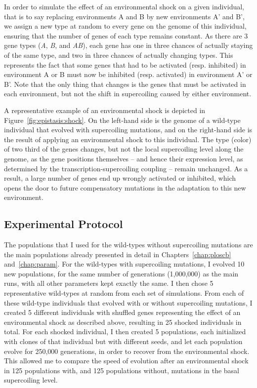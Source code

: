 In order to simulate the effect of an environmental shock on a given individual, that is to say replacing environments A and B by new environments A' and B', we assign a new type at random to every gene on the genome of this individual, ensuring that the number of genes of each type remains constant.
As there are 3 gene types (\emph{A}, \emph{B}, and \emph{AB}), each gene has one in three chances of actually staying of the same type, and two in three chances of actually changing types.
This represents the fact that some genes that had to be activated (resp. inhibited) in environment A or B must now be inhibited (resp. activated) in environment A' or B'.
Note that the only thing that changes is the genes that must be activated in each environment, but not the shift in supercoiling caused by either environment.

A representative example of an environmental shock is depicted in Figure~\ref{fig:epistasis:shock}.
On the left-hand side is the genome of a wild-type individual that evolved with supercoiling mutations, and on the right-hand side is the result of applying an environmental shock to this individual.
The type (color) of two third of the genes changes, but not the local supercoiling level along the genome, as the gene positions themselves -- and hence their expression level, as determined by the transcription-supercoiling coupling -- remain unchanged.
As a result, a large number of genes end up wrongly activated or inhibited, which opens the door to future compensatory mutations in the adaptation to this new environment.

\subsection{Experimental Protocol}

The populations that I used for the wild-types without supercoiling mutations are the main populations already presented in detail in Chapters~\ref{chap:ploscb} and~\ref{chap:param}.
For the wild-types with supercoiling mutations, I evolved 10 new populations, for the same number of generations (1,000,000) as the main runs, with all other parameters kept exactly the same.
I then chose 5 representative wild-types at random from each set of simulations.
From each of these wild-type individuals that evolved with or without supercoiling mutations, I created 5 different individuals with shuffled genes representing the effect of an environmental shock as described above, resulting in 25 shocked individuals in total.
For each shocked individual, I then created 5 populations, each initialized with clones of that individual but with different seeds, and let each population evolve for 250,000 generations, in order to recover from the environmental shock.
This allowed me to compare the speed of evolution after an environmental shock in 125 populations with, and 125 populations without, mutations in the basal supercoiling level.


